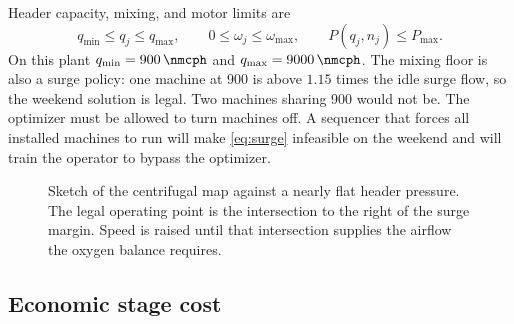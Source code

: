 Header capacity, mixing, and motor limits are
\begin{equation}
\label{eq:boxes}
q_{\min}
\le
q_{j}
\le
q_{\max},
\qquad
0
\le
\omega_{j}
\le
\omega_{\max},
\qquad
P(q_{j},n_{j})
\le
P_{\max}.
\end{equation}
On this plant $q_{\min}=\SI{900}{\nmcph}$ and $q_{\max}=\SI{9000}{\nmcph}$. The mixing floor is also a surge policy: one machine at \SI{900}{\nmcph} is above $1.15$ times the idle surge flow, so the weekend solution is legal. Two machines sharing \SI{900}{\nmcph} would not be. The optimizer must be allowed to turn machines off. A sequencer that forces all installed machines to run will make \eqref{eq:surge} infeasible on the weekend and will train the operator to bypass the optimizer.

\begin{figure}[ht]
\centering
{}
\caption{Sketch of the centrifugal map against a nearly flat header pressure. The legal operating point is the intersection to the right of the surge margin. Speed is raised until that intersection supplies the airflow the oxygen balance requires.}
\label{fig:fanmap}
\end{figure}

\subsection{Economic stage cost}

